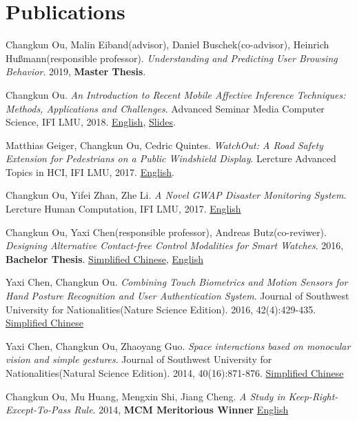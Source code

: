 \section{\textbf{Publications}}
 \resumeSubHeadingListStart
    \item{
        Changkun Ou, Malin Eiband(advisor), Daniel Buschek(co-advisor), Heinrich Hußmann(responsible professor).
        \emph{Understanding and Predicting User Browsing Behavior}. 
        2019, \textbf{Master Thesis}.
    }
    \item{
        Changkun Ou.
        \emph{An Introduction to Recent Mobile Affective Inference Techniques: Methods, Applications and Challenges}.
        Advanced Seminar Media Computer Science, IFI LMU, 2018. \href{https://github.com/changkun/hs-ws17-mobile-emotion-inference/blob/master/src/lmumihs-ou.pdf}{English}, \href{https://github.com/changkun/hs-ws17-mobile-emotion-inference/blob/master/slides/presentation-final.pdf}{Slides}.
    }
    \item{
        Matthias Geiger, Changkun Ou, Cedric Quintes.
        \emph{WatchOut: A Road Safety Extension for Pedestrians on a Public Windshield Display}.
        Lercture Advanced Topics in HCI, IFI LMU, 2017. \href{https://github.com/changkun/ath-windshild-display/blob/master/paper/ath.pdf}{English}.
    }
    \item{
        Changkun Ou, Yifei Zhan, Zhe Li.
        \emph{A Novel GWAP Disaster Monitoring System}.
        Lercture Human Computation, IFI LMU, 2017.
        \href{https://github.com/changkun/hc-ss17-disaster-monitoring/blob/master/report/hc_final_project_report_team_Hotpot.pdf}{English}
    }
    \item{
        Changkun Ou, Yaxi Chen(responsible professor), Andreas Butz(co-reviwer).
        \emph{Designing Alternative Contact-free Control Modalities for Smart Watches}. 
        2016, \textbf{Bachelor Thesis}. \href{https://changkun.us/files/cv/bachelor-thesis-cn.html}{Simplified Chinese}, 
        \href{https://changkun.us/files/cv/bachelor-thesis-en.html}{English}
    }
    \item{
        Yaxi Chen, Changkun Ou. 
        \emph{Combining Touch Biometrics and Motion Sensors for Hand Posture Recognition and User Authentication System}. 
        Journal of Southwest University for Nationalities(Nature Science Edition). 
        2016, 42(4):429-435. \href{https://changkun.us/files/cv/touch.swun.html}{Simplified Chinese}
    }
    \item{
        Yaxi Chen, Changkun Ou, Zhaoyang Guo.
        \emph{Space interactions based on monocular vision and simple gestures}. 
        Journal of Southwest University for Nationalities(Natural Science Edition). 
        2014, 40(16):871-876. \href{https://changkun.us/files/cv/vision.swun.html}{Simplified Chinese}
    }
    \item{
        Changkun Ou, Mu Huang, Mengxin Shi, Jiang Cheng. 
        \emph{A Study in Keep-Right-Except-To-Pass Rule}. 
        2014, \textbf{MCM Meritorious Winner} \href{https://changkun.us/files/cv/28922.public.html}{English}
    }
 \resumeSubHeadingListEnd